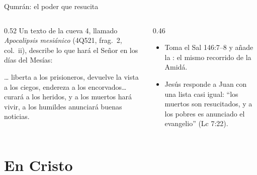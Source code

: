 \begin{frame}{Qumrán: el poder que resucita}
\begin{columns}[t,onlytextwidth]
\begin{column}{0.52\textwidth}\small
Un texto de la cueva 4, llamado \emph{Apocalipsis mesiánico} (4Q521, frag.~2, col.~ii), describe lo que hará el Señor en los días del Mesías:\par\smallskip
\begin{cita}[colback=dorado!10!papiro,colframe=dorado!80!azul,fontupper=\scriptsize\itshape]\ldots{} liberta a los prisioneros, devuelve la vista a los ciegos, endereza a los encorvados\ldots{} curará a los heridos, y a los muertos hará vivir, a los humildes anunciará buenas noticias.\end{cita}
\end{column}
\begin{column}{0.46\textwidth}\small
\begin{itemize}
\item Toma el Sal 146:7--8 y añade la : el mismo recorrido de la Amidá.
\item Jesús responde a Juan con una lista casi igual: ``los muertos son resucitados, y a los pobres es anunciado el evangelio'' (Lc 7:22).
\end{itemize}
\end{column}
\end{columns}
\end{frame}

\section{En Cristo}

